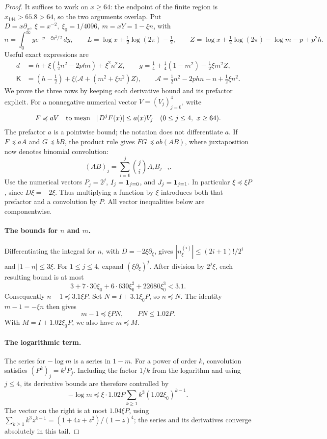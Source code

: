 \begin{proof}
It suffices to work on \(x\ge64\): the endpoint of the finite region
is \(x_{144}>65.8>64\), so the two arguments overlap. Put \(D=x\partial_x,\ \xi=x^{-2},\ \xi_0=1/4096,\ m=xY=1-\xi n\), with
\[
 n=\int_0^\infty y e^{-y-\xi y^2/2}\,dy,\qquad L=\log x+\tfrac12\log(2\pi)-\tfrac12,\qquad
 Z=\log x+\tfrac12\log(2\pi)-\log m-p+p^2h.
\]
Useful exact expressions are
\[
\begin{aligned}
 d&=h+\xi(\tfrac12 n^2-2p h n)+\xi^2 n^2 Z,\qquad
 g=\tfrac14+\tfrac14(1-m^2)-\tfrac12 \xi m^2 Z,\\
 \mathsf K&=(h-\tfrac12)+\xi\big(\mathcal A+(m^2+\xi n^2)Z\big),\qquad
 \mathcal A=\tfrac12 n^2-2p h n-n+\tfrac12\xi n^2 .
\end{aligned}
\]
We prove the three rows by keeping each derivative bound and its
prefactor explicit. For a nonnegative numerical vector
\(V=(V_j)_{j=0}^4\), write
\[
 F\preccurlyeq aV
 \quad\hbox{to mean}\quad
 |D^jF(x)|\le a(x)V_j
 \quad(0\le j\le4,\ x\ge64).
\]
The prefactor \(a\) is a pointwise bound; the notation does not
differentiate \(a\). If \(F\preccurlyeq aA\) and
\(G\preccurlyeq bB\), the product rule gives
\(FG\preccurlyeq ab(AB)\), where juxtaposition now denotes
binomial convolution:
\[
 (AB)_j=\sum_{i=0}^j\binom ji A_iB_{j-i}.
\]
Use the numerical vectors
\(P_j=2^j\), \(I_j={\bf1}_{j=0}\), and \(J_j={\bf1}_{j=1}\).
In particular \(\xi\preccurlyeq\xi P\), since \(D\xi=-2\xi\).
Thus multiplying a function by \(\xi\) introduces both that prefactor
and a convolution by \(P\). All vector inequalities below are
componentwise.

\paragraph{The bounds for \(n\) and \(m\).}
Differentiating the integral for \(n\), with
\(D=-2\xi\partial_\xi\), gives
\(|n^{(i)}_\xi|\le(2i+1)!/2^i\) and \(|1-n|\le3\xi\).
For \(1\le j\le4\), expand \((\xi\partial_\xi)^j\).
After division by \(2^j\xi\), each resulting bound is at most
\[
 3+7\cdot30\xi_0+6\cdot630\xi_0^2+22680\xi_0^3<3.1.
\]
Consequently \(n-1\preccurlyeq3.1\xi P\). Set
\(N=I+3.1\xi_0P\), so \(n\preccurlyeq N\).
The identity \(m-1=-\xi n\) then gives
\[
 m-1\preccurlyeq\xi PN,\qquad PN\le1.02P.
\]
With \(M=I+1.02\xi_0P\), we also have \(m\preccurlyeq M\).

\paragraph{The logarithmic term.}
The series for \(-\log m\) is a series in \(1-m\).
For a power of order \(k\), convolution satisfies
\((P^k)_j=k^jP_j\). Including the factor \(1/k\) from the logarithm
and using \(j\le4\), its derivative bounds are therefore controlled by
\[
 -\log m\preccurlyeq
 \xi\cdot1.02P\sum_{k\ge1}k^3(1.02\xi_0)^{k-1}.
\]
The vector on the right is at most \(1.04\xi P\), using
\(\sum_{k\ge1}k^3z^{k-1}=(1+4z+z^2)/(1-z)^4\);
the series and its derivatives converge absolutely in this tail.


\end{proof}
